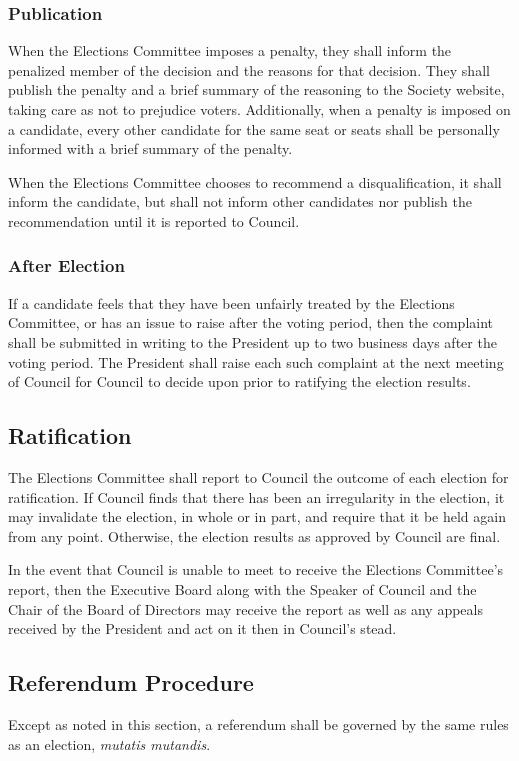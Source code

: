 \subsubsection{Publication}
When the Elections Committee imposes a penalty, they shall inform the penalized member of the decision and the reasons for that decision.
They shall publish the penalty and a brief summary of the reasoning to the Society website, taking care as not to prejudice voters.
Additionally, when a penalty is imposed on a candidate, every other candidate for the same seat or seats shall be personally informed with a brief summary of the penalty.

When the Elections Committee chooses to recommend a disqualification, it shall inform the candidate, but shall not inform other candidates nor publish the recommendation until it is reported to Council.

\subsubsection{After Election}
If a candidate feels that they have been unfairly treated by the Elections Committee, or has an issue to raise after the voting period, then the complaint shall be submitted in writing to the President up to two business days after the voting period.
The President shall raise each such complaint at the next meeting of Council for Council to decide upon prior to ratifying the election results.

\subsection{Ratification}
The Elections Committee shall report to Council the outcome of each election for ratification.
If Council finds that there has been an irregularity in the election, it may invalidate the election, in whole or in part, and require that it be held again from any point.
Otherwise, the election results as approved by Council are final.

In the event that Council is unable to meet to receive the Elections Committee's report, then the Executive Board along with the Speaker of Council and the Chair of the Board of Directors  may receive the report as well as any appeals received by the President and act on it then in Council's stead.

\subsection{Referendum Procedure}
Except as noted in this section, a referendum shall be governed by the same rules as an election, \emph{mutatis mutandis}.

